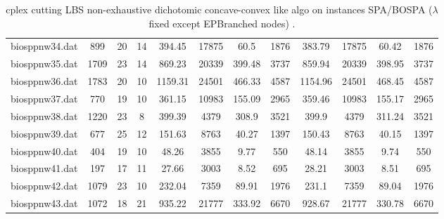 \begin{sidewaystable}[!ht]
{\begin{tabular}{lccccccccccc}
biosppnw34.dat & 899 & 20 & 14 & 394.45 & 17875 & 60.5 & 1876 & 383.79 & 17875 &  \textcolor{blue2}{60.42} & 1876 \\
biosppnw35.dat & 1709 & 23 & 14 & 869.23 & 20339 & 399.48 & 3737 & 859.94 & 20339 & 398.95 & 3737 \\
biosppnw36.dat & 1783 & 20 & 10 & 1159.31 & 24501 & 466.33 & 4587 & 1154.96 & 24501 & 468.45 & 4587 \\
biosppnw37.dat & 770 & 19 & 10 & 361.15 & 10983 &  \textcolor{blue2}{155.09} & 2965 & 359.46 & 10983 & 155.17 & 2965 \\
biosppnw38.dat & 1220 & 23 & 8 & 399.39 & 4379 & 308.9 & 3521 & 399.9 & 4379 & 311.24 & 3521 \\
biosppnw39.dat & 677 & 25 & 12 & 151.63 & 8763 & 40.27 & 1397 & 150.43 & 8763 &  \textcolor{blue2}{40.15} & 1397 \\
biosppnw40.dat & 404 & 19 & 10 & 48.26 & 3855 & 9.77 & 550 & 48.14 & 3855 &  \textcolor{blue2}{9.74} & 550 \\
biosppnw41.dat & 197 & 17 & 11 & 27.66 & 3003 & 8.52 & 695 & 28.21 & 3003 &  \textcolor{blue2}{8.51} & 695 \\
biosppnw42.dat & 1079 & 23 & 10 & 232.04 & 7359 & 89.91 & 1976 & 231.1 & 7359 &  \textcolor{blue2}{89.04} & 1976 \\
biosppnw43.dat & 1072 & 18 & 21 & 935.22 & 21777 & 333.92 & 6670 & 928.67 & 21777 &  \textcolor{blue2}{330.78} & 6670 \\
\bottomrule
\end{tabular}
}%
\caption{cplex cutting LBS non-exhaustive dichotomic concave-convex like algo on instances SPA/BOSPA ($\lambda$ fixed except EPBranched nodes) .}
\end{sidewaystable}
